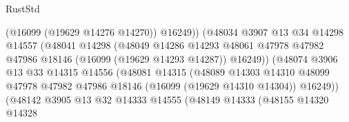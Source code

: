 \begin{lexlean}{RustStd}
\begin{coremodule}
                                            (@16099 (@19629 @14276 @14270))
                                            @16249))
                                        (@48034
                                          @3907
                                          @13
                                          @34
                                          @14298
                                          @14557
                                          (@48041
                                            @14298
                                            (@48049
                                              @14286
                                              @14293
                                              @48061
                                              @47978
                                              @47982
                                              @47986
                                              @18146
                                              (@16099 (@19629 @14293 @14287))
                                              @16249))
                                          (@48074
                                            @3906
                                            @13
                                            @33
                                            @14315
                                            @14556
                                            (@48081
                                              @14315
                                              (@48089
                                                @14303
                                                @14310
                                                @48099
                                                @47978
                                                @47982
                                                @47986
                                                @18146
                                                (@16099 (@19629 @14310 @14304))
                                                @16249))
                                            (@48142
                                              @3905
                                              @13
                                              @32
                                              @14333
                                              @14555
                                              (@48149
                                                @14333
                                                (@48155
                                                  @14320
                                                  @14328

\end{coremodule}
\end{lexlean}
